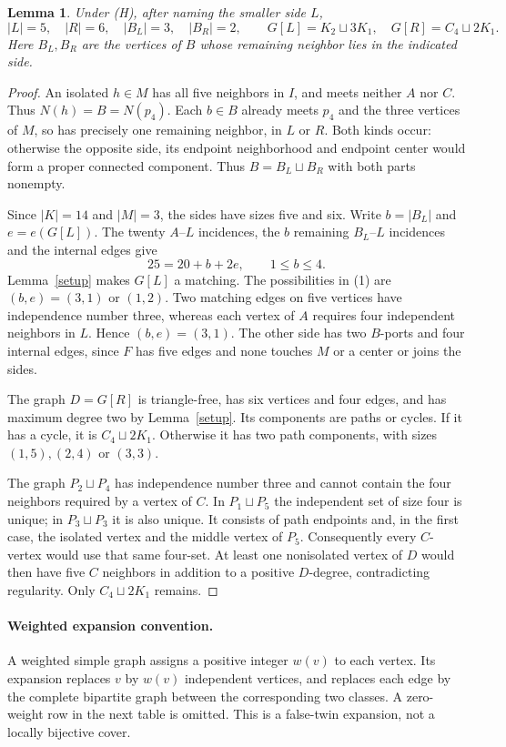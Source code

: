 \documentclass[11pt]{article}
\newtheorem{lemma}[theorem]{Lemma}
\begin{document}
\begin{lemma}\label{sides}
Under \textup{(H)}, after naming the smaller side $L$,
\[
 |L|=5,\quad |R|=6,\quad |B_L|=3,\quad |B_R|=2,
 \qquad G[L]=K_2\sqcup3K_1,\quad G[R]=C_4\sqcup2K_1.
\]
Here $B_L,B_R$ are the vertices of $B$ whose remaining neighbor lies
in the indicated side.
\end{lemma}
\begin{proof}
An isolated $h\in M$ has all five neighbors in $I$, and meets neither
$A$ nor $C$. Thus $N(h)=B=N(p_4)$. Each $b\in B$ already meets
$p_4$ and the three vertices of $M$, so has precisely one remaining
neighbor, in $L$ or $R$. Both kinds occur: otherwise the opposite
side, its endpoint neighborhood and endpoint center would form a
proper connected component. Thus $B=B_L\sqcup B_R$ with both parts
nonempty.

Since $|K|=14$ and $|M|=3$, the sides have sizes five and six.
Write $b=|B_L|$ and $e=e(G[L])$. The twenty $A$--$L$ incidences,
the $b$ remaining $B_L$--$L$ incidences and the internal edges give
\[
 25=20+b+2e,\qquad 1\leq b\leq4.                         \tag{1}
\]
Lemma~\ref{setup} makes $G[L]$ a matching. The possibilities in (1)
are $(b,e)=(3,1)$ or $(1,2)$. Two matching edges on five vertices
have independence number three, whereas each vertex of $A$ requires
four independent neighbors in $L$. Hence $(b,e)=(3,1)$.
The other side has two $B$-ports and four internal edges, since $F$
has five edges and none touches $M$ or a center or joins the sides.

The graph $D=G[R]$ is triangle-free, has six vertices and four edges,
and has maximum degree two by Lemma~\ref{setup}. Its components
are paths or cycles. If it has a cycle, it is $C_4\sqcup2K_1$.
Otherwise it has two path components, with sizes $(1,5),(2,4)$
or $(3,3)$.

The graph $P_2\sqcup P_4$ has independence number three and cannot
contain the four neighbors required by a vertex of $C$.
In $P_1\sqcup P_5$ the independent set of size four is unique;
in $P_3\sqcup P_3$ it is also unique. It consists of path endpoints
and, in the first case, the isolated vertex and the middle vertex
of $P_5$. Consequently every $C$-vertex would use that same four-set.
At least one nonisolated vertex of $D$ would then have five $C$
neighbors in addition to a positive $D$-degree, contradicting regularity.
Only $C_4\sqcup2K_1$ remains.
\end{proof}

\paragraph{Weighted expansion convention.}
A weighted simple graph assigns a positive integer $w(v)$ to each
vertex. Its expansion replaces $v$ by $w(v)$ independent vertices,
and replaces each edge by the complete bipartite graph between the
corresponding two classes. A zero-weight row in the next table is
omitted. This is a false-twin expansion, not a locally bijective cover.
\end{document}
